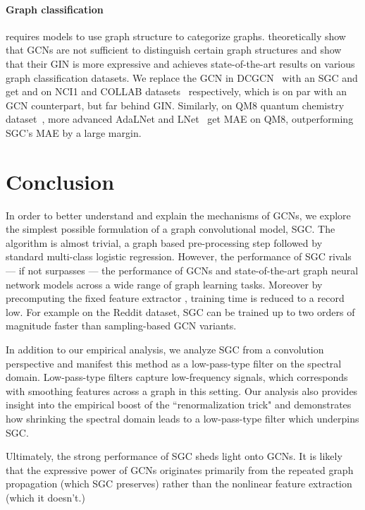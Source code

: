 \documentclass{article}
\newcommand{\method}{SGC}
\begin{document}
\paragraph{Graph classification} requires models to use graph structure to categorize graphs.
\citet{xu2018how} theoretically show that GCNs are not sufficient to distinguish certain graph structures and show that their GIN is more expressive and achieves state-of-the-art results on various graph classification datasets. We replace the GCN in DCGCN~\citep{zhang2018end} with an \method{} and get  and  on NCI1 and COLLAB datasets~\citep{yanardag2015deep} respectively, which is on par with an GCN counterpart, but far behind GIN. Similarly, on QM8 quantum chemistry dataset~\citep{ramakrishnan2015electronic}, more advanced AdaLNet and LNet~\citep{liao2018lanczosnet} get  MAE on QM8, outperforming \method{}'s  MAE by a large margin.
 
\section{Conclusion}
In order to better understand and explain the mechanisms of GCNs, we explore the simplest possible formulation of a graph convolutional model, \method{}. The algorithm is almost trivial, a graph based pre-processing step  followed by standard multi-class logistic regression. However, the performance of \method{} rivals --- if not surpasses --- the performance of GCNs and state-of-the-art graph neural network models across a wide range of graph learning tasks.
Moreover by precomputing the fixed feature extractor , training time is reduced to a record low.
For example on the Reddit dataset, \method{} can be trained up to two orders of magnitude faster than sampling-based GCN variants. 

In addition to our empirical analysis, we analyze \method{} from a convolution perspective and manifest this method as a low-pass-type filter on the spectral domain. Low-pass-type filters capture low-frequency signals, which corresponds with smoothing features across a graph in this setting. 
Our analysis also provides insight into the empirical boost of the ``renormalization trick" and demonstrates how shrinking the spectral domain leads to a low-pass-type filter which underpins \method{}. 

Ultimately, the strong performance of \method{} sheds light onto GCNs. It is likely that the expressive power of GCNs originates primarily from the repeated graph propagation (which \method{} preserves) rather than the nonlinear feature extraction (which it doesn't.) 
\end{document}
